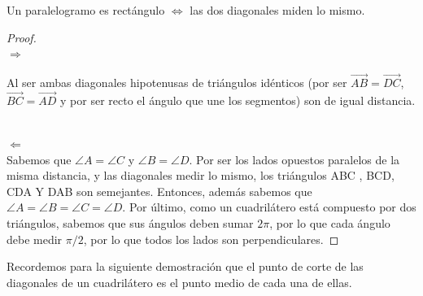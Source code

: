 \begin{nprop}
  Un paralelogramo es rectángulo $\iff$ las dos diagonales miden lo mismo.
\end{nprop}
\begin{proof}\hfill \\
  $\boxed{\Rightarrow}$\hfill\\
   \begin{minipage}[c]{0.75\textwidth}

  Al ser ambas diagonales hipotenusas de triángulos idénticos (por ser $\vec{AB}=\vec{DC}$, $\vec{BC}=\vec{AD}$ y por ser recto el ángulo que une los segmentos) son de igual distancia.\hfill

  \end{minipage}\hfill
  \begin{minipage}[]{0.2\textwidth}




  \end{minipage}\\
  $\boxed{\Leftarrow}$ \\
  Sabemos que $\angle A = \angle C $ y $\angle B = \angle D$.
  Por ser los lados opuestos paralelos de la misma distancia, y las diagonales medir lo mismo, los triángulos ABC , BCD, CDA Y DAB son semejantes. Entonces, además sabemos que  $\angle A = \angle
 B = \angle C  = \angle D$. Por último, como un cuadrilátero está compuesto por dos triángulos, sabemos que sus ángulos deben sumar $2\pi$, por lo que cada ángulo debe
  medir $\pi/2$, por lo que todos los lados son perpendiculares.

\end{proof}

\begin{nota}
	Recordemos para la siguiente demostración que el punto de corte de las diagonales de un cuadrilátero es el punto medio de cada una de ellas.
\end{nota}


